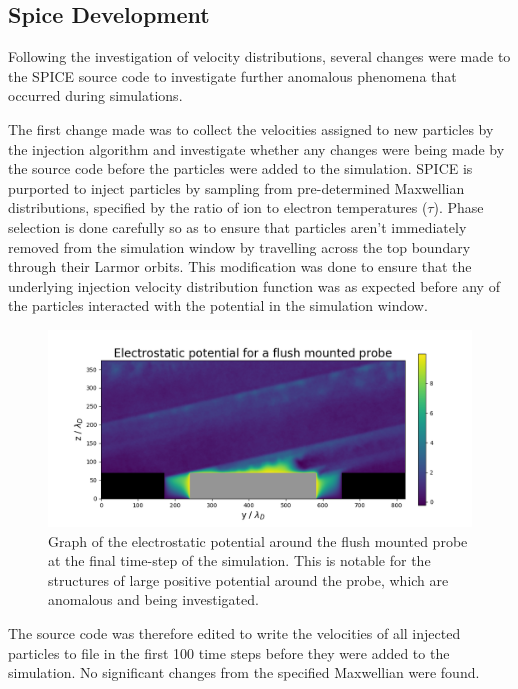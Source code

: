 \documentclass[a4paper, 11pt]{article} %
\begin{document}
\subsection{\label{subsec:spicedevel}Spice Development}
	Following the investigation of velocity distributions, several changes were made to the SPICE source code to investigate further anomalous phenomena that occurred during simulations. 
	
	The first change made was to collect the velocities assigned to new particles by the injection algorithm and investigate whether any changes were being made by the source code before the particles were added to the simulation. 
	SPICE is purported to inject particles by sampling from pre-determined Maxwellian distributions, specified by the ratio of ion to electron temperatures ($\tau$).
	Phase selection is done carefully so as to ensure that particles aren't immediately removed from the simulation window by travelling across the top boundary through their Larmor orbits.
	This modification was done to ensure that the underlying injection velocity distribution function was as expected before any of the particles interacted with the potential in the simulation window.
	\begin{figure}
		
		\vspace{-10pt}
		\centering
		\includegraphics[width=1.0\linewidth]{AllDataFigures/SpiceSimulations/SamBenchmarking/FullGrid/Gap/PotentialResized.png}
		
		\caption{\label{fig:potentialstructures}Graph of the electrostatic potential around the flush mounted probe at the final time-step of the simulation. This is notable for the structures of large positive potential around the probe, which are anomalous and being investigated.}
		\vspace{-10pt}
	\end{figure}
	The source code was therefore edited to write the velocities of all injected particles to file in the first 100 time steps before they were added to the simulation.
	No significant changes from the specified Maxwellian were found.
	
\end{document}
